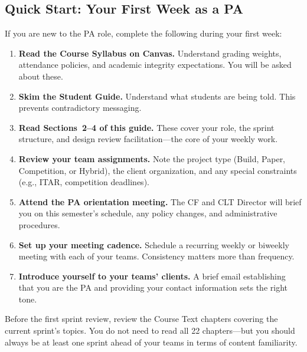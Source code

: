 \subsection{Quick Start: Your First Week as a PA}

If you are new to the PA role, complete the following during your first week:

\begin{enumerate}[nosep,leftmargin=1.5em]
\item \textbf{Read the Course Syllabus on Canvas.} Understand grading weights, attendance policies, and academic integrity expectations. You will be asked about these.

\item \textbf{Skim the Student Guide.} Understand what students are being told. This prevents contradictory messaging.

\item \textbf{Read Sections~2--4 of this guide.} These cover your role, the sprint structure, and design review facilitation---the core of your weekly work.

\item \textbf{Review your team assignments.} Note the project type (Build, Paper, Competition, or Hybrid), the client organization, and any special constraints (e.g., ITAR, competition deadlines).

\item \textbf{Attend the PA orientation meeting.} The CF and CLT Director will brief you on this semester's schedule, any policy changes, and administrative procedures.

\item \textbf{Set up your meeting cadence.} Schedule a recurring weekly or biweekly meeting with each of your teams. Consistency matters more than frequency.

\item \textbf{Introduce yourself to your teams' clients.} A brief email establishing that you are the PA and providing your contact information sets the right tone.
\end{enumerate}

\begin{paaction}
Before the first sprint review, review the Course Text chapters covering the current sprint's topics. You do not need to read all 22 chapters---but you should always be at least one sprint ahead of your teams in terms of content familiarity.
\end{paaction}


